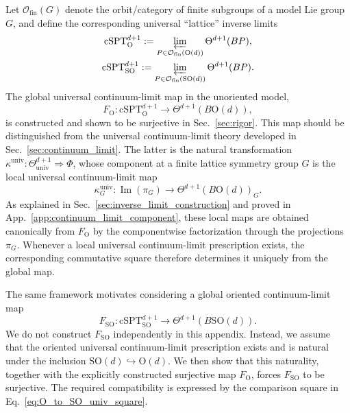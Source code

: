 \documentclass[aps,prx,reprint,superscriptaddress,twocolumn,amsmath,amssymb,amsfonts, nofootinbib]{revtex4-2}
\newcommand{\SO}{\text{SO}}
\theoremstyle{apsstyle}
\begin{document}
Let $\mathcal O_{\mathrm{fin}}(G)$ denote the orbit/category of finite subgroups of a model Lie group $G$,
and define the corresponding universal ``lattice'' inverse limits
\begin{gather*}
\mathrm{cSPT}^{d+1}_{\mathrm O}
:= \varprojlim_{P\in \mathcal O_{\mathrm{fin}}(\mathrm{O}(d))}\Theta^{d+1}(BP),\\
\mathrm{cSPT}^{d+1}_{\mathrm{SO}}
:= \varprojlim_{P\in \mathcal O_{\mathrm{fin}}(\SO(d))}\Theta^{d+1}(BP).
\end{gather*}
The global universal continuum-limit map in the unoriented model,
\begin{equation*}
    F_{\mathrm O}: \mathrm{cSPT}^{d+1}_{\mathrm O}
    \longrightarrow \Theta^{d+1}(B\mathrm O(d)),
\end{equation*}
is constructed and shown to be surjective in Sec.~\ref{sec:rigor}. This map should be distinguished from the universal continuum-limit theory developed in Sec.~\ref{sec:continuum_limit}. The latter is the natural transformation $\kappa^{\mathrm{univ}}:\Theta_{\mathrm{univ}}^{d+1}\Longrightarrow\Phi$, whose component at a finite lattice symmetry group $G$ is the local universal continuum-limit map
\begin{equation*}
    \kappa_G^{\mathrm{univ}}:
    \operatorname{Im}(\pi_G)
    \longrightarrow
    \Theta^{d+1}(B\mathrm O(d))_G.
\end{equation*}
As explained in Sec.~\ref{sec:inverse_limit_construction} and proved
in App.~\ref{app:continuum_limit_component}, these local maps are
obtained canonically from $F_{\mathrm O}$ by the componentwise
factorization through the projections $\pi_G$. Whenever a local
universal continuum-limit prescription exists, the corresponding
commutative square therefore determines it uniquely from the global
map.

The same framework motivates considering a global oriented
continuum-limit map
\begin{equation*}
    F_{\mathrm{SO}}:
    \mathrm{cSPT}^{d+1}_{\mathrm{SO}}
    \longrightarrow
    \Theta^{d+1}(B\SO(d)).
\end{equation*}
We do not construct $F_{\mathrm{SO}}$ independently in this appendix.
Instead, we assume that the oriented universal continuum-limit
prescription exists and is natural under the inclusion
$\SO(d)\hookrightarrow\mathrm O(d)$. We then show that this naturality,
together with the explicitly constructed surjective map
$F_{\mathrm O}$, forces $F_{\mathrm{SO}}$ to be surjective. The
required compatibility is expressed by the comparison square
in Eq.~\eqref{eq:O_to_SO_univ_square}.
\end{document}
